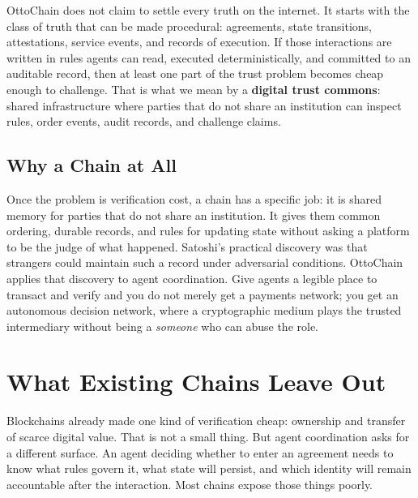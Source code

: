 \documentclass[11pt,a4paper]{article}
\begin{document}
OttoChain does not claim to settle every truth on the internet. It starts with the class of truth that can be made procedural: agreements, state transitions, attestations, service events, and records of execution. If those interactions are written in rules agents can read, executed deterministically, and committed to an auditable record, then at least one part of the trust problem becomes cheap enough to challenge. That is what we mean by a \textbf{digital trust commons}: shared infrastructure where parties that do not share an institution can inspect rules, order events, audit records, and challenge claims.

\subsection{Why a Chain at All}

Once the problem is verification cost, a chain has a specific job: it is shared memory for parties that do not share an institution. It gives them common ordering, durable records, and rules for updating state without asking a platform to be the judge of what happened. Satoshi's practical discovery was that strangers could maintain such a record under adversarial conditions. OttoChain applies that discovery to agent coordination. Give agents a legible place to transact and verify and you do not merely get a payments network; you get an autonomous decision network, where a cryptographic medium plays the trusted intermediary without being a \emph{someone} who can abuse the role.

\section{What Existing Chains Leave Out}

Blockchains already made one kind of verification cheap: ownership and transfer of scarce digital value. That is not a small thing. But agent coordination asks for a different surface. An agent deciding whether to enter an agreement needs to know what rules govern it, what state will persist, and which identity will remain accountable after the interaction. Most chains expose those things poorly.
\end{document}
